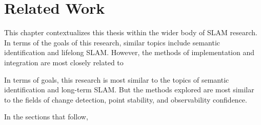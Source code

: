 \section{Related Work}
\label{sec:related_work}

This chapter contextualizes this thesis within the wider body of SLAM research. In terms of the goals of this research, similar topics include semantic identification and lifelong SLAM. However, the methods of implementation and integration are most closely related to 

In terms of goals, this research is most similar to the topics of semantic identification and long-term SLAM. But the methods explored are most similar to the fields of change detection, point stability, and observability confidence.

In the sections that follow,
% 